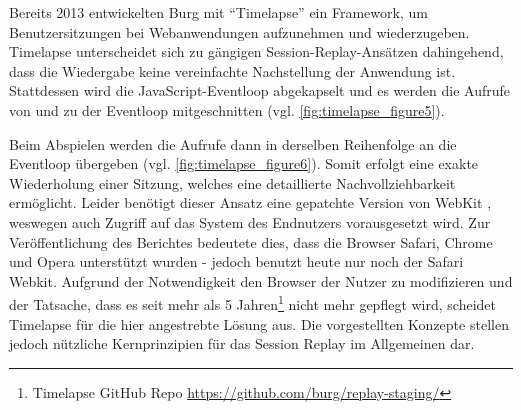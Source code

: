 Bereits 2013 entwickelten Burg \etal \cite{TimelapsePaper} mit \enquote{Timelapse} ein Framework, um Benutzersitzungen bei Webanwendungen aufzunehmen und wiederzugeben. Timelapse unterscheidet sich zu gängigen Session-Replay-Ansätzen dahingehend, dass die Wiedergabe keine vereinfachte Nachstellung der Anwendung ist. Stattdessen wird die JavaScript-Eventloop abgekapselt und es werden die Aufrufe von und zu der Eventloop mitgeschnitten (vgl. \autoref{fig:timelapse_figure5}).

Beim Abspielen werden die Aufrufe dann in derselben Reihenfolge an die Eventloop übergeben (vgl. \autoref{fig:timelapse_figure6}). Somit erfolgt eine exakte Wiederholung einer Sitzung, welches eine detaillierte Nachvollziehbarkeit ermöglicht. Leider benötigt dieser Ansatz eine gepatchte Version von WebKit \cite{WebKit}, weswegen auch Zugriff auf das System des Endnutzers vorausgesetzt wird. Zur Veröffentlichung des Berichtes bedeutete dies, dass die Browser Safari, Chrome und Opera unterstützt wurden - jedoch benutzt heute nur noch der Safari Webkit. Aufgrund der Notwendigkeit den Browser der Nutzer zu modifizieren und der Tatsache, dass es seit mehr als 5 Jahren\footnote{Timelapse GitHub Repo \url{https://github.com/burg/replay-staging/}} nicht mehr gepflegt wird, scheidet Timelapse für die hier angestrebte Lösung aus. Die vorgestellten Konzepte stellen jedoch nützliche Kernprinzipien für das Session Replay im Allgemeinen dar.